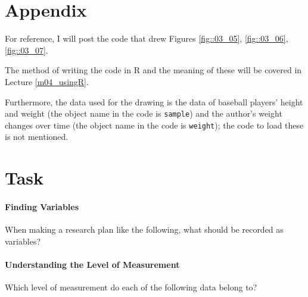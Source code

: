 \documentclass{ltjsbook}
\begin{document}
\section{Appendix}

For reference, I will post the code that drew Figures \ref{fig::03_05}, \ref{fig::03_06}, \ref{fig::03_07}.

The method of writing the code in R and the meaning of these will be covered in Lecture \ref{m04_usingR}.

Furthermore, the data used for the drawing is the data of baseball players' height and weight (the object name in the code is \texttt{sample}) and the author's weight changes over time (the object name in the code is \texttt{weight}); the code to load these is not mentioned.





\section{Task}
\paragraph{Finding Variables} When making a research plan like the following, what should be recorded as variables?


\paragraph{Understanding the Level of Measurement} Which level of measurement do each of the following data belong to?

\end{document}
